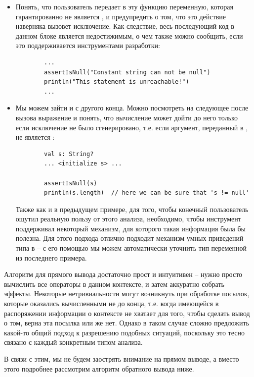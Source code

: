\begin{itemize}
    \item Понять, что пользователь передает в эту функцию переменную, которая гарантированно не является , и предупредить о том, что это действие наверняка вызовет исключение. Как следствие, весь последующий код в данном блоке является недостижимым, о чем также можно сообщить, если это поддерживается инструментами разработки:

    \begin{verbatim}
        ...
        assertIsNull("Constant string can not be null")
        println("This statement is unreachable!")
        ...
    \end{verbatim}

    \item Мы можем зайти и с другого конца. Можно посмотреть на следующее после вызова выражение и понять, что вычисление может дойти до него только если исключение не было сгенерировано, т.е. если аргумент, переданный в , не является :

    \begin{verbatim}
        val s: String?
        ... <initialize s> ...

        assertIsNull(s)
        println(s.length)  // here we can be sure that 's != null'
    \end{verbatim}

    Также как и в предыдущем примере, для того, чтобы конечный пользователь ощутил реальную пользу от этого анализа, необходимо, чтобы инструмент поддерживал некоторый механизм, для которого такая информация была бы полезна. Для этого подхода отлично подходит механизм умных приведений типа в  -- с его помощью мы можем автоматически уточнить тип переменной  из последнего примера.
\end{itemize}

Алгоритм для прямого вывода достаточно прост и интуитивен -- нужно просто вычислить все операторы в данном контексте, и затем аккуратно собрать эффекты. Некоторые нетривиальности могут возникнуть при обработке посылок, которые оказались вычисленными не до конца, т.е. когда имеющейся в распоряжении информации о контексте не хватает для того, чтобы сделать вывод о том, верна эта посылка или же нет. Однако в таком случае сложно предложить какой-то общий подход к разрешению подобных ситуаций, поскольку это тесно связано с каждый конкретным типом анализа.

В связи с этим, мы не будем заострять внимание на прямом выводе, а вместо этого подробнее рассмотрим алгоритм обратного вывода ниже.


